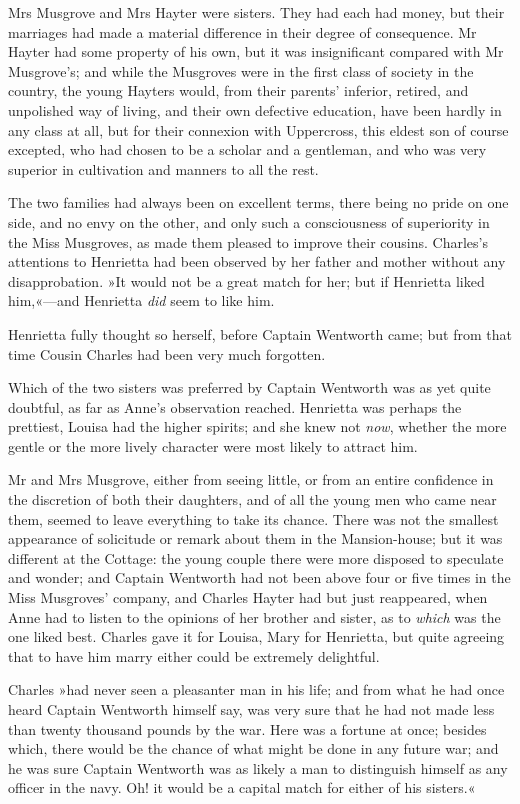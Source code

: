 Mrs Musgrove and Mrs Hayter were sisters. They had each had money, but their marriages had made a material difference in their degree of consequence. Mr Hayter had some property of his own, but it was insignificant compared with Mr Musgrove's; and while the Musgroves were in the first class of society in the country, the young Hayters would, from their parents' inferior, retired, and unpolished way of living, and their own defective education, have been hardly in any class at all, but for their connexion with Uppercross, this eldest son of course excepted, who had chosen to be a scholar and a gentleman, and who was very superior in cultivation and manners to all the rest.

The two families had always been on excellent terms, there being no pride on one side, and no envy on the other, and only such a consciousness of superiority in the Miss Musgroves, as made them pleased to improve their cousins. Charles's attentions to Henrietta had been observed by her father and mother without any disapprobation. »It would not be a great match for her; but if Henrietta liked him,«—and Henrietta \textit{did} seem to like him.

Henrietta fully thought so herself, before Captain Wentworth came; but from that time Cousin Charles had been very much forgotten.

Which of the two sisters was preferred by Captain Wentworth was as yet quite doubtful, as far as Anne's observation reached. Henrietta was perhaps the prettiest, Louisa had the higher spirits; and she knew not \textit{now}, whether the more gentle or the more lively character were most likely to attract him.

Mr and Mrs Musgrove, either from seeing little, or from an entire confidence in the discretion of both their daughters, and of all the young men who came near them, seemed to leave everything to take its chance. There was not the smallest appearance of solicitude or remark about them in the Mansion-house; but it was different at the Cottage: the young couple there were more disposed to speculate and wonder; and Captain Wentworth had not been above four or five times in the Miss Musgroves' company, and Charles Hayter had but just reappeared, when Anne had to listen to the opinions of her brother and sister, as to \textit{which} was the one liked best. Charles gave it for Louisa, Mary for Henrietta, but quite agreeing that to have him marry either could be extremely delightful.

Charles »had never seen a pleasanter man in his life; and from what he had once heard Captain Wentworth himself say, was very sure that he had not made less than twenty thousand pounds by the war. Here was a fortune at once; besides which, there would be the chance of what might be done in any future war; and he was sure Captain Wentworth was as likely a man to distinguish himself as any officer in the navy. Oh! it would be a capital match for either of his sisters.«

